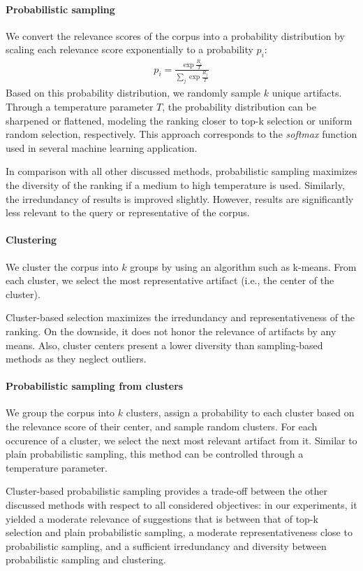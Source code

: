 \paragraph{Probabilistic sampling}
We convert the relevance scores of the corpus into a probability distribution by scaling each relevance score exponentially to a probability $p_i$:
\begin{align}
	p_i = \frac{\exp \frac{R_i}{T}}{\sum_j \exp \frac{R_j}{T}}
\end{align}
Based on this probability distribution, we randomly sample $k$ unique artifacts.
Through a temperature parameter $T$, the probability distribution can be sharpened or flattened, modeling the ranking closer to top-k selection or uniform random selection, respectively.
This approach corresponds to the \emph{softmax} function used in several machine learning application.

In comparison with all other discussed methods, probabilistic sampling maximizes the diversity of the ranking if a medium to high temperature is used.
Similarly, the irredundancy of results is improved slightly.
However, results are significantly less relevant to the query or representative of the corpus.

\paragraph{Clustering}
We cluster the corpus into $k$ groups by using an algorithm such as k-means.
From each cluster, we select the most representative artifact (i.e., the center of the cluster).

Cluster-based selection maximizes the irredundancy and representativeness of the ranking.
On the downside, it does not honor the relevance of artifacts by any means.
Also, cluster centers present a lower diversity than sampling-based methods as they neglect outliers.

\paragraph{Probabilistic sampling from clusters}
We group the corpus into $k$ clusters, assign a probability to each cluster based on the relevance score of their center, and sample random clusters.
For each occurence of a cluster, we select the next most relevant artifact from it.
Similar to plain probabilistic sampling, this method can be controlled through a temperature parameter.

Cluster-based probabilistic sampling provides a trade-off between the other discussed methods with respect to all considered objectives:
in our experiments, it yielded a moderate relevance of suggestions that is between that of top-k selection and plain probabilistic sampling, a moderate representativeness close to probabilistic sampling, and a sufficient irredundancy and diversity between probabilistic sampling and clustering.

